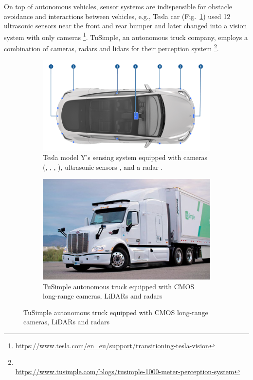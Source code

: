 On top of autonomous vehicles, sensor systems are indispensible for obstacle avoidance and interactions between vehicles, 
e.g., Tesla car (Fig.~\ref{fig:intro_tesla}) used 12 ultrasonic sensors 
near the front and rear bumper 
and later changed into a vision system with only cameras 
\footnote{\url{https://www.tesla.com/en_eu/support/transitioning-tesla-vision}}. 
TuSimple, an autonomous truck company, employs a combination of cameras, radars and lidars 
for their perception system \footnote{\\ \url{https://www.tusimple.com/blogs/tusimple-1000-meter-perception-system}}. 

\begin{figure}[ht] 
    \centering 

    \begin{subfigure}[b]{0.49\textwidth} 
        \includegraphics[width=\textwidth]{figures/tesla.png} 
        \caption{
        Tesla model Y's sensing system
        equipped with cameras (, 
        , 
        , ),
        ultrasonic sensors , and a radar .
        }

        \label{fig:intro_tesla} 
    \end{subfigure} \hfill
    \begin{subfigure}[b]{0.4\textwidth} 
        \includegraphics[width=\textwidth]{figures/tusimple.jpg} 
        \caption{TuSimple autonomous truck equipped with CMOS long-range cameras, LiDARs and radars} 
        \label{fig:intro_truckcam} 
    \end{subfigure} 
    
\end{figure} 

